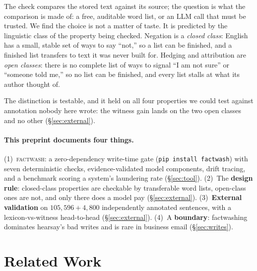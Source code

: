 \documentclass[11pt]{article}
\newcommand{\sys}{\textsc{factwash}\xspace}
\begin{document}
The check compares the stored text against its source; the question is what the
comparison is made of: a free, auditable word list, or an LLM call that must be
trusted. We find the
choice is not a matter of taste. It is predicted by the linguistic class of the property
being checked. Negation is a \emph{closed class}: English has a small, stable set of
ways to say ``not,'' so a list can be finished, and a finished list transfers to text it
was never built for. Hedging and attribution are \emph{open classes}: there is no
complete list of ways to signal ``I am not sure'' or ``someone told me,'' so no list can
be finished, and every list stalls at what its author thought of.

The distinction is testable, and it held on all four properties we could test against
annotation nobody here wrote: the witness gain lands on the two open classes and no
other (\S\ref{sec:external}).

\paragraph{This preprint documents four things.}
(1)~\sys: a zero-dependency write-time gate (\texttt{pip install factwash}) with seven
deterministic checks, evidence-validated model components, drift tracing, and a
benchmark scoring a system's laundering rate (\S\ref{sec:tool}).
(2)~The \textbf{design rule}: closed-class properties are checkable by transferable
word lists, open-class ones are not, and only there does a model pay
(\S\ref{sec:external}).
(3)~\textbf{External validation} on $105{,}596 + 4{,}800$ independently annotated
sentences, with a lexicon-vs-witness head-to-head (\S\ref{sec:external}).
(4)~A \textbf{boundary}: factwashing dominates hearsay's bad writes and is rare in
business email (\S\ref{sec:writes}).

\section{Related Work}
\label{sec:related}
\end{document}
